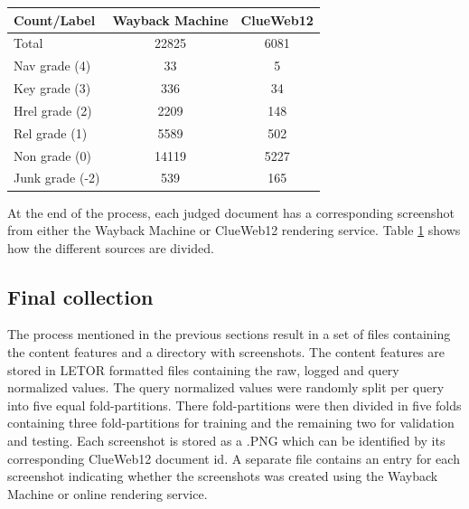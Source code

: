 \begin{table}[h]
  \begin{tabular}{ l | c | c  }
    Count/Label & Wayback Machine & ClueWeb12 \\
    \hline
    Total & 22825 & 6081 \\
    Nav grade (4) & 33 & 5 \\
    Key grade (3) & 336 & 34 \\
    Hrel grade (2) & 2209 & 148 \\
    Rel grade (1) & 5589 & 502 \\
    Non grade (0) & 14119 & 5227 \\
    Junk grade (-2) & 539 & 165 \\
    \hline
  \end{tabular}
   \label{tab:countsources} 
\end{table}

At the end of the process, each judged document has a corresponding screenshot from either the Wayback Machine or ClueWeb12 rendering service. Table \ref{tab:countsources} shows how the different sources are divided.

\subsection{Final collection}
The process mentioned in the previous sections result in a set of files containing the content features and a directory with screenshots. The content features are stored in LETOR formatted files containing the raw, logged and query normalized values. The query normalized values were randomly split per query into five equal fold-partitions. There fold-partitions were then divided in five folds containing three fold-partitions for training and the remaining two for validation and testing. Each screenshot is stored as a .PNG which can be identified by its corresponding ClueWeb12 document id. A separate file contains an entry for each screenshot indicating whether the screenshots was created using the Wayback Machine or online rendering service. 


